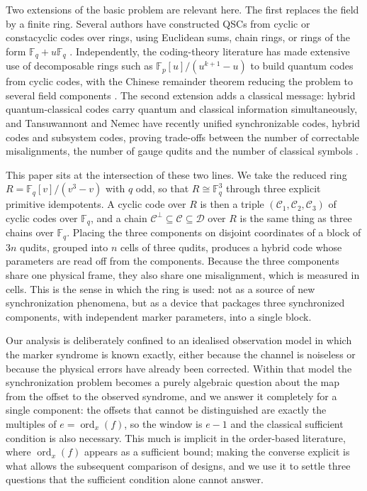 \documentclass[11pt,reqno]{amsart}
\theoremstyle{definition}
\theoremstyle{remark}
\newcommand{\F}{\mathbb{F}}
\newcommand{\ord}{\operatorname{ord}}
\begin{document}
Two extensions of the basic problem are relevant here. The first replaces the field by a finite ring. Several authors have constructed QSCs from cyclic or constacyclic codes over rings, using Euclidean sums, chain rings, or rings of the form $\F_q+u\F_q$ \cite{LiuLiu2021,DaiLiu2022,LiuHuLiu2024}. Independently, the coding-theory literature has made extensive use of decomposable rings such as $\F_p[u]/(u^{k+1}-u)$ to build quantum codes from cyclic codes, with the Chinese remainder theorem reducing the problem to several field components \cite{DinhEtAl2021,DinhBagUpadhyay2021}. The second extension adds a classical message: hybrid quantum-classical codes carry quantum and classical information simultaneously, and Tansuwannont and Nemec have recently unified synchronizable codes, hybrid codes and subsystem codes, proving trade-offs between the number of correctable misalignments, the number of gauge qudits and the number of classical symbols \cite{TansuwannontNemec2026}.


This paper sits at the intersection of these two lines. We take the reduced ring $R=\F_q[v]/(v^3-v)$ with $q$ odd, so that $R\cong\F_q^3$ through three explicit primitive idempotents. A cyclic code over $R$ is then a triple $(\mathcal C_1,\mathcal C_2,\mathcal C_3)$ of cyclic codes over $\F_q$, and a chain $\mathcal C^\perp\subseteq\mathcal C\subseteq\mathcal D$ over $R$ is the same thing as three chains over $\F_q$. Placing the three components on disjoint coordinates of a block of $3n$ qudits, grouped into $n$ cells of three qudits, produces a hybrid code whose parameters are read off from the components. Because the three components share one physical frame, they also share one misalignment, which is measured in cells. This is the sense in which the ring is used: not as a source of new synchronization phenomena, but as a device that packages three synchronized components, with independent marker parameters, into a single block.


Our analysis is deliberately confined to an idealised observation model in which the marker syndrome is known exactly, either because the channel is noiseless or because the physical errors have already been corrected. Within that model the synchronization problem becomes a purely algebraic question about the map from the offset to the observed syndrome, and we answer it completely for a single component: the offsets that cannot be distinguished are exactly the multiples of $e=\ord_x(f)$, so the window is $e-1$ and the classical sufficient condition is also necessary. This much is implicit in the order-based literature, where $\ord_x(f)$ appears as a sufficient bound; making the converse explicit is what allows the subsequent comparison of designs, and we use it to settle three questions that the sufficient condition alone cannot answer.
\end{document}
